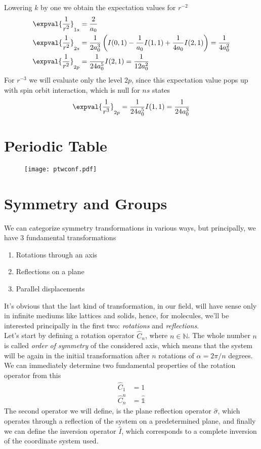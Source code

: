 \documentclass[a4paper, 11pt]{book}
\newcommand{\1}{\opr{\mathds{1}}}
\newcommand{\opr}[1]{\hat{#1}}
\newcommand{\N}{\mathbb{N}}
\theoremstyle{plain}
\begin{document}
	Lowering $k$ by one we obtain the expectation values for $r^{-2}$
	\begin{equation}
		\begin{aligned}
			\expval{\frac{1}{r^2}}_{1s}&=\frac{2}{a_0}\\
			\expval{\frac{1}{r^2}}_{2s}&=\frac{1}{2a_0^3}\left( I(0,1)-\frac{1}{a_0}I(1,1)+\frac{1}{4a_0}I(2,1) \right)=\frac{1}{4a_0^2}\\
			\expval{\frac{1}{r^2}}_{2p}&=\frac{1}{24a_0^5}I(2,1)=\frac{1}{12a_0^2}
		\end{aligned}
		\label{eq:rminustwoapp}
	\end{equation}
	For $r^{-3}$ we will evaluate only the level $2p$, since this expectation value pops up with spin orbit interaction, which is null for $ns$ states
	\begin{equation}
		\expval{\frac{1}{r^3}}_{2p}=\frac{1}{24a_0^5}I(1,1)=\frac{1}{24a_0^3}
		\label{eq:rminusthreeapp}
	\end{equation}
	\chapter{Periodic Table}
	\vfill
	\newpage
	\begin{figure}[H]
		\texttt{[image: ptwconf.pdf]}
	\end{figure}
	\chapter{Symmetry and Groups}\label{app:groups}
	We can categorize symmetry transformations in various ways, but principally, we have 3 fundamental transformations
	\begin{enumerate}
	\item Rotations through an axis
	\item Reflections on a plane
	\item Parallel displacements
	\end{enumerate}
	It's obvious that the last kind of transformation, in our field, will have sense only in infinite mediums like lattices and solids, hence, for molecules, we'll be interested principally in the first two: \textit{rotations} and \textit{reflections}.\\
	Let's start by defining a rotation operator $\opr{C}_n$, where $n\in\N$. The whole number $n$ is called \textit{order of symmetry} of the considered axis, which means that the system will be again in the initial transformation after $n$ rotations of $\alpha=2\pi/n$ degrees.\\
	We can immediately determine two fundamental properties of the rotation operator from this
	\begin{equation*}
		\begin{aligned}
			\opr{C}_1&=1\\
			\opr{C}_n^n&=\1
		\end{aligned}
	\end{equation*}
	The second operator we will define, is the plane reflection operator $\opr{\sigma}$, which operates through a reflection of the system on a predetermined plane, and finally we can define the inversion operator $\opr{I}$, which corresponds to a complete inversion of the coordinate system used.\\
\end{document}
